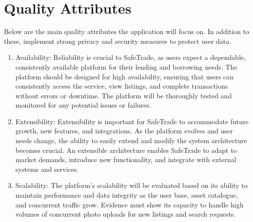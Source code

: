\section*{Quality Attributes}
Below are the main quality attributes the application will focus on. 
In addition to these, implement strong privacy and security measures to protect user data.
\begin{enumerate}
\item Availability: Reliability is crucial to SafeTrade, as users expect a dependable, consistently available platform for their lending and borrowing needs. The platform should be designed for high availability, ensuring that users can consistently access the service, view listings, and complete transactions without errors or downtime. The platform will be thoroughly tested and monitored for any potential issues or failures.
\item Extensibility: Extensibility is important for SafeTrade to accommodate future growth, new features, and integrations. As the platform evolves and user needs change, the ability to easily extend and modify the system architecture becomes crucial. An extensible architecture enables SafeTrade to adapt to market demands, introduce new functionality, and integrate with external systems and services.
\item Scalability: The platform's scalability will be evaluated based on its ability to maintain performance and data integrity as the user base, asset catalogue, and concurrent traffic grow. Evidence must show its capacity to handle high volumes of concurrent photo uploads for new listings and search requests. 
\end{enumerate}

